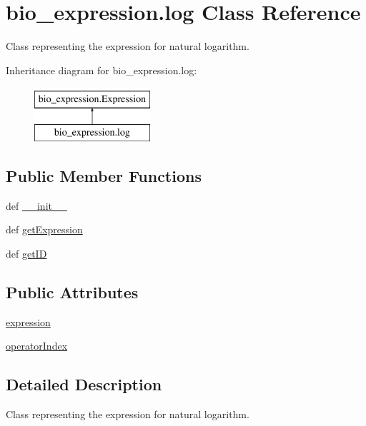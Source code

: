 \hypertarget{classbio__expression_1_1log}{\section{bio\+\_\+expression.\+log Class Reference}
\label{classbio__expression_1_1log}
}


Class representing the expression for natural logarithm.  


Inheritance diagram for bio\+\_\+expression.\+log\+:\begin{figure}[H]
\begin{center}
\leavevmode
\includegraphics[height=2.000000cm]{da/d2b/classbio__expression_1_1log}
\end{center}
\end{figure}
\subsection*{Public Member Functions}
\begin{DoxyCompactItemize}
\item 
def \hyperlink{classbio__expression_1_1log_a8ed7b4c8444a37e31b45463e6d13417b}{\+\_\+\+\_\+init\+\_\+\+\_\+}
\item 
def \hyperlink{classbio__expression_1_1log_a254e9cb7ff4ac53cdeffbdf0081d76f4}{get\+Expression}
\item 
def \hyperlink{classbio__expression_1_1log_ab1fd6a953a37715e7b0d99e15a725c9f}{get\+I\+D}
\end{DoxyCompactItemize}
\subsection*{Public Attributes}
\begin{DoxyCompactItemize}
\item 
\hyperlink{classbio__expression_1_1log_a03faf6253c7c30504051d884068672a3}{expression}
\item 
\hyperlink{classbio__expression_1_1log_a2d3c8babc9e04c6a807449be5db7b712}{operator\+Index}
\end{DoxyCompactItemize}


\subsection{Detailed Description}
Class representing the expression for natural logarithm. 


